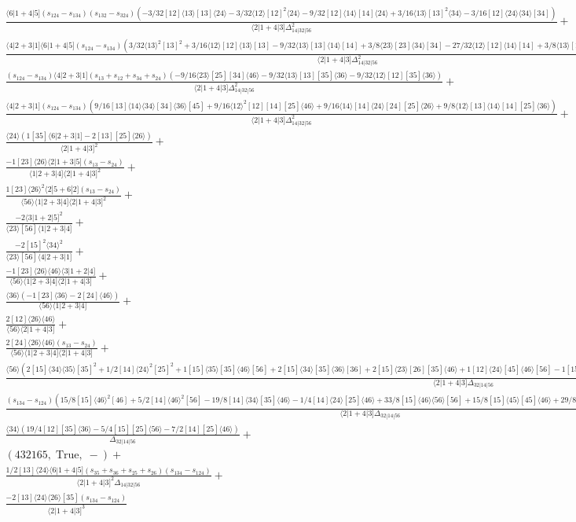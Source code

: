 \documentclass[varwidth, border=5pt]{standalone}
\begin{document}
\begin{my}
$\begin{gathered}
\scriptscriptstyle\frac{⟨6|1+4|5](s_{124}-s_{134})(s_{132}-s_{324})(-3/32[12]⟨13⟩[13]⟨24⟩-3/32⟨12⟩[12]^2⟨24⟩-9/32[12]⟨14⟩[14]⟨24⟩+3/16⟨13⟩[13]^2⟨34⟩-3/16[12]⟨24⟩⟨34⟩[34])}{⟨2|1+4|3]Δ_{14|32|56}^2}+\\
\scriptscriptstyle\frac{⟨4|2+3|1]⟨6|1+4|5](s_{124}-s_{134})(3/32⟨13⟩^2[13]^2+3/16⟨12⟩[12]⟨13⟩[13]-9/32⟨13⟩[13]⟨14⟩[14]+3/8⟨23⟩[23]⟨34⟩[34]-27/32⟨12⟩[12]⟨14⟩[14]+3/8⟨13⟩[13]⟨23⟩[23]+3/32⟨12⟩^2[12]^2)}{⟨2|1+4|3]Δ_{14|32|56}^2}+\\
\scriptscriptstyle\frac{(s_{124}-s_{134})⟨4|2+3|1](s_{13}+s_{12}+s_{34}+s_{24})(-9/16⟨23⟩[25][34]⟨46⟩-9/32⟨13⟩[13][35]⟨36⟩-9/32⟨12⟩[12][35]⟨36⟩)}{⟨2|1+4|3]Δ_{14|32|56}^2}+\\
\scriptscriptstyle\frac{⟨4|2+3|1](s_{124}-s_{134})(9/16[13]⟨14⟩⟨34⟩[34]⟨36⟩[45]+9/16⟨12⟩^2[12][14][25]⟨46⟩+9/16⟨14⟩[14]⟨24⟩[24][25]⟨26⟩+9/8⟨12⟩[13]⟨14⟩[14][25]⟨36⟩)}{⟨2|1+4|3]Δ_{14|32|56}^2}+\\
\scriptscriptstyle\frac{⟨24⟩(1[35]⟨6|2+3|1]-2[13][25]⟨26⟩)}{⟨2|1+4|3]^2}+\\
\scriptscriptstyle\frac{-1[23]⟨26⟩⟨2|1+3|5](s_{13}-s_{24})}{⟨1|2+3|4]⟨2|1+4|3]^2}+\\
\scriptscriptstyle\frac{1[23]⟨26⟩^2⟨2|5+6|2](s_{13}-s_{24})}{⟨56⟩⟨1|2+3|4]⟨2|1+4|3]^2}+\\
\scriptscriptstyle\frac{-2⟨3|1+2|5]^2}{⟨23⟩[56]⟨1|2+3|4]}+\\
\scriptscriptstyle\frac{-2[15]^2⟨34⟩^2}{⟨23⟩[56]⟨4|2+3|1]}+\\
\scriptscriptstyle\frac{-1[23]⟨26⟩⟨46⟩⟨3|1+2|4]}{⟨56⟩⟨1|2+3|4]⟨2|1+4|3]}+\\
\scriptscriptstyle\frac{⟨36⟩(-1[23]⟨36⟩-2[24]⟨46⟩)}{⟨56⟩⟨1|2+3|4]}+\\
\scriptscriptstyle\frac{2[12]⟨26⟩⟨46⟩}{⟨56⟩⟨2|1+4|3]}+\\
\scriptscriptstyle\frac{2[24]⟨26⟩⟨46⟩(s_{13}-s_{24})}{⟨56⟩⟨1|2+3|4]⟨2|1+4|3]}+\\
\scriptscriptstyle\frac{⟨56⟩(2[15]⟨34⟩⟨35⟩[35]^2+1/2[14]⟨24⟩^2[25]^2+1[15]⟨35⟩[35]⟨46⟩[56]+2[15]⟨34⟩[35]⟨36⟩[36]+2[15]⟨23⟩[26][35]⟨46⟩+1[12]⟨24⟩[45]⟨46⟩[56]-1[15]⟨46⟩^2[46][56]+1/2[14]⟨46⟩^2[56]^2+2[15]⟨23⟩[25][35]⟨45⟩+21/4[14]⟨24⟩[25]⟨34⟩[35])}{⟨2|1+4|3]Δ_{32|14|56}}+\\
\scriptscriptstyle\frac{(s_{134}-s_{124})(15/8[15]⟨46⟩^2[46]+5/2[14]⟨46⟩^2[56]-19/8[14]⟨34⟩[35]⟨46⟩-1/4[14]⟨24⟩[25]⟨46⟩+33/8[15]⟨46⟩⟨56⟩[56]+15/8[15]⟨45⟩[45]⟨46⟩+29/8[15]⟨24⟩[25]⟨56⟩-19/8[12]⟨26⟩⟨34⟩[35])}{⟨2|1+4|3]Δ_{32|14|56}}+\\
\scriptscriptstyle\frac{⟨34⟩(19/4[12][35]⟨36⟩-5/4[15][25]⟨56⟩-7/2[14][25]⟨46⟩)}{Δ_{32|14|56}}+\\
\scriptscriptstyle(432165,\;\text{True},\;-)+\\
\scriptscriptstyle\frac{1/2[13]⟨24⟩⟨6|1+4|5](s_{35}+s_{36}+s_{25}+s_{26})(s_{134}-s_{124})}{⟨2|1+4|3]^2Δ_{14|32|56}}+\\
\scriptscriptstyle\frac{-2[13]⟨24⟩⟨26⟩[35](s_{134}-s_{124})}{⟨2|1+4|3]^3}\phantom{+}
\end{gathered}$
\end{my}
\end{document}
